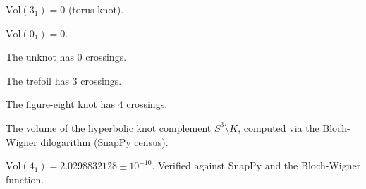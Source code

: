 \begin{theorem}
  \label{thm:trefoil-volume-zero}
  \leanok
  $\mathrm{Vol}(3_1) = 0$ (torus knot).
\end{theorem}

\begin{theorem}
  \label{thm:unknot-volume-zero}
  \leanok
  $\mathrm{Vol}(0_1) = 0$.
\end{theorem}

\begin{theorem}
  \label{thm:unknot-crossing-count}
  \leanok
  The unknot has 0 crossings.
\end{theorem}

\begin{theorem}
  \label{thm:trefoil-crossing-count}
  \leanok
  The trefoil has 3 crossings.
\end{theorem}

\begin{theorem}
  \label{thm:figure-eight-crossing-count}
  \leanok
  The figure-eight knot has 4 crossings.
\end{theorem}

\begin{definition}
  \label{def:hyperbolic-volume}
  The volume of the hyperbolic knot complement $S^3 \setminus K$,
  computed via the Bloch-Wigner dilogarithm (SnapPy census).
\end{definition}

\begin{definition}
  \label{def:vol-figure-eight}
  \leanok
  $\mathrm{Vol}(4_1) = 2.0298832128 \pm 10^{-10}$.
  Verified against SnapPy and the Bloch-Wigner function.
\end{definition}


